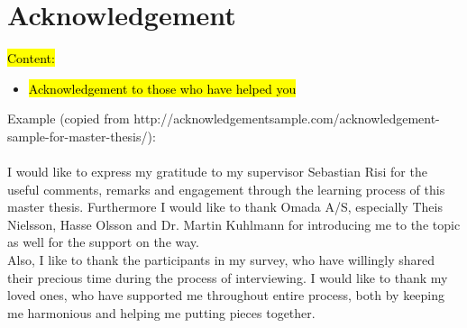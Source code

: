 \newpage
\section{Acknowledgement}
\hl{Content:}
\begin{itemize}
    \item \hl{Acknowledgement to those who have helped you}
\end{itemize}
Example (copied from http://acknowledgementsample.com/acknowledgement-sample-for-master-thesis/):\\\\
I would like to express my gratitude to my supervisor Sebastian Risi for the useful comments, remarks and engagement through the learning process of this master thesis.
Furthermore I would like to thank Omada A/S, especially Theis Nielsson, Hasse Olsson and Dr. Martin Kuhlmann for introducing me to the topic as well for the support on the way.\\
Also, I like to thank the participants in my survey, who have willingly shared their precious time during the process of interviewing.
I would like to thank my loved ones, who have supported me throughout entire process, both by keeping me harmonious and helping me putting pieces together.